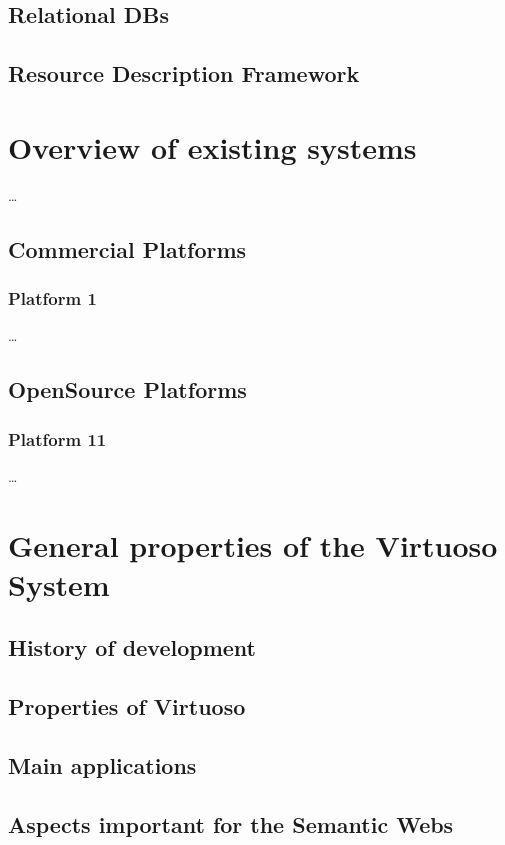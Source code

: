 \subsection{Relational DBs}

\subsection{Resource Description Framework}
\label{sec:RDF}

\section{Overview of existing systems}
\ldots

\subsection{Commercial Platforms}
\label{sec:commercial_platforms}

\subsubsection{Platform 1}
\ldots

\subsection{OpenSource Platforms}
\label{sec:open_source_platforms}

\subsubsection{Platform 11}
\ldots

\section{General properties of the Virtuoso System}
\subsection{History of development}
\subsection{Properties of Virtuoso}
\subsection{Main applications}
\subsection{Aspects important for the Semantic Webs}


